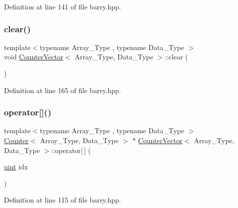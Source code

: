 Definition at line 141 of file barry.\+hpp.

\mbox{\label{classbarry_1_1_counter_vector_acce75748f917e3a7898d49a23df996e7}} 
\subsubsection{\texorpdfstring{clear()}{clear()}}
{\footnotesize\ttfamily template$<$typename Array\+\_\+\+Type , typename Data\+\_\+\+Type $>$ \\
void \hyperlink{classbarry_1_1_counter_vector}{Counter\+Vector}$<$ Array\+\_\+\+Type, Data\+\_\+\+Type $>$\+::clear (\begin{DoxyParamCaption}{ }\end{DoxyParamCaption})\hspace{0.3cm}{\ttfamily [inline]}}



Definition at line 165 of file barry.\+hpp.

\mbox{\label{classbarry_1_1_counter_vector_a6eac3e73298e1e6d424b92f324ffe9a8}} 
\subsubsection{\texorpdfstring{operator[]()}{operator[]()}}
{\footnotesize\ttfamily template$<$typename Array\+\_\+\+Type , typename Data\+\_\+\+Type $>$ \\
\hyperlink{classbarry_1_1_counter}{Counter}$<$ Array\+\_\+\+Type, Data\+\_\+\+Type $>$ $\ast$ \hyperlink{classbarry_1_1_counter_vector}{Counter\+Vector}$<$ Array\+\_\+\+Type, Data\+\_\+\+Type $>$\+::operator\mbox{[}$\,$\mbox{]} (\begin{DoxyParamCaption}\item[{\hyperlink{namespacebarry_a11dfc53ddb4672278319aa04f1e09a6c}{uint}}]{idx }\end{DoxyParamCaption})\hspace{0.3cm}{\ttfamily [inline]}}



Definition at line 115 of file barry.\+hpp.

